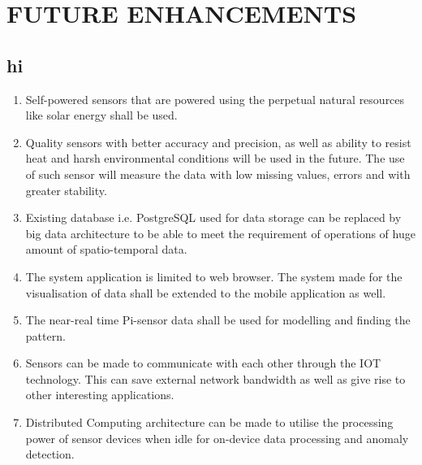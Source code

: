 

\newpage
\section{FUTURE ENHANCEMENTS}
\subsection{hi }
\begin{enumerate}
  \setlength\itemsep{1.5em}
    \item Self-powered sensors that are powered using the perpetual natural resources like solar energy shall be used.

	\item Quality sensors with better accuracy and precision, as well as ability to resist heat and harsh environmental conditions will be used in the future. The use of such sensor will measure the data with low missing values, errors and with greater stability.
	
	\item Existing database i.e. PostgreSQL used for data storage can be replaced by big data architecture to be able to meet the requirement of operations of huge amount of spatio-temporal data.
	
	
	\item The system application is limited to web browser. The system made for the visualisation of data shall be extended to the mobile application as well.
	
	\item The near-real time Pi-sensor data shall be used for modelling and finding the pattern.
	

	\item  Sensors can be made to communicate with each other through the IOT technology. This can save external network bandwidth as well as give rise to other interesting applications.
	
		\item  Distributed Computing architecture can be made to utilise the processing power of sensor devices when idle for on-device data processing and anomaly detection.
	          
\end{enumerate}